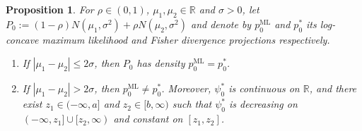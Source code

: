 \documentclass[a4paper]{article}
\newcommand{\R}{\mathbb{R}}
\newtheorem{proposition}[theorem]{Proposition}
\theoremstyle{definition}
\begin{document}
\begin{proposition}
\label{prop:gaussian-mixture}
For $\rho \in (0,1)$, $\mu_1,\mu_2 \in \R$ and $\sigma > 0$, let $P_0 := (1 - \rho)N(\mu_1,\sigma^2) + \rho N(\mu_2,\sigma^2)$ and denote by $p_0^{\mathrm{ML}}$ and $p_0^*$ its log-concave maximum likelihood and Fisher divergence projections respectively.
\begin{enumerate}[label=(\alph*)]
\item If $|\mu_1 - \mu_2| \leq 2\sigma$, then $P_0$ has density $p_0^{\mathrm{ML}} = p_0^*$.
\item If $|\mu_1 - \mu_2| > 2\sigma$, then $p_0^{\mathrm{ML}} \neq p_0^*$. Moreover, $\psi_0^*$ is continuous on $\R$, and there exist $z_1 \in (-\infty,a]$ and $z_2 \in [b,\infty)$ such that $\psi_0^*$ is decreasing on $(-\infty,z_1] \cup [z_2,\infty)$ and constant on $[z_1,z_2]$.
\end{enumerate}
\end{proposition}
\end{document}
